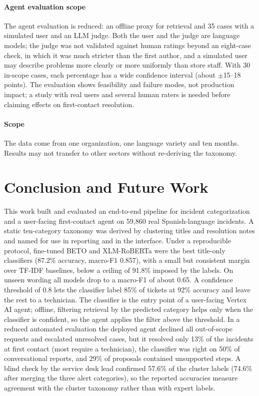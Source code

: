 \documentclass[conference]{IEEEtran}
\begin{document}
\paragraph{Agent evaluation scope} The agent evaluation is reduced: an offline proxy for retrieval and 35 cases
with a simulated user and an LLM judge. Both the user and the judge are language models; the judge was not
validated against human ratings beyond an eight-case check, in which it was much stricter than the first author, and a
simulated user may describe problems more clearly or more uniformly than store staff. With 30 in-scope cases, each percentage has a wide confidence interval (about $\pm$15--18 points).
The evaluation shows feasibility and failure modes, not production impact; a study with real users and several
human raters is needed before claiming effects on first-contact resolution.

\paragraph{Scope} The data come from one organization, one language variety and ten months. Results may not
transfer to other sectors without re-deriving the taxonomy.

\section{Conclusion and Future Work}

This work built and evaluated an end-to-end pipeline for incident categorization and a user-facing first-contact agent on
59,860 real Spanish-language incidents. A static ten-category taxonomy was derived by clustering titles and
resolution notes and named for use in reporting and in the interface. Under a reproducible protocol, fine-tuned
BETO and XLM-RoBERTa were the best title-only classifiers (87.2\% accuracy, macro-F1 0.857), with a small but
consistent margin over TF-IDF baselines, below a ceiling of 91.8\% imposed by the labels. On unseen wording all
models drop to a macro-F1 of about 0.65. A confidence threshold of 0.8 lets the classifier label 85\% of tickets
at 92\% accuracy and leave the rest to a technician. The classifier is the entry point of a user-facing Vertex AI
agent; offline, filtering retrieval by the predicted category helps only when the classifier is confident, so the
agent applies the filter above the threshold. In a reduced automated evaluation the deployed agent declined all
out-of-scope requests and escalated unresolved cases, but it resolved only 13\% of the incidents at first contact
(most require a technician), the classifier was right on 50\% of conversational reports, and 29\% of proposals
contained unsupported steps. A blind check by the service desk lead confirmed 57.6\% of the cluster labels (74.6\%
after merging the three alert categories), so the reported accuracies measure agreement with the cluster
taxonomy rather than with expert labels.
\end{document}
